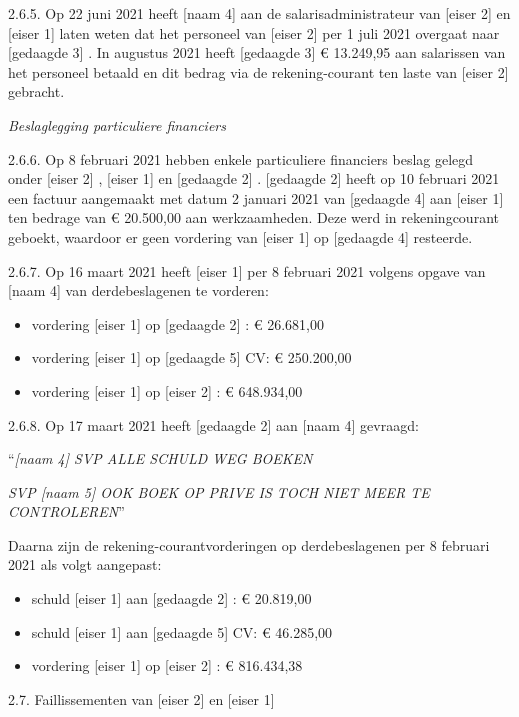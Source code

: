 \documentclass[
  dutch,
  a4paper,
]{article}
\begin{document}
2.6.5. Op 22 juni 2021 heeft {[}naam 4{]} aan de salarisadministrateur van {[}eiser 2{]} en {[}eiser 1{]} laten weten dat het personeel van {[}eiser 2{]} per 1 juli 2021 overgaat naar {[}gedaagde 3{]} . In augustus 2021 heeft {[}gedaagde 3{]} € 13.249,95 aan salarissen van het personeel betaald en dit bedrag via de rekening-courant ten laste van {[}eiser 2{]} gebracht.

\emph{Beslaglegging particuliere financiers}

2.6.6. Op 8 februari 2021 hebben enkele particuliere financiers beslag gelegd onder {[}eiser 2{]} , {[}eiser 1{]} en {[}gedaagde 2{]} . {[}gedaagde 2{]} heeft op 10 februari 2021 een factuur aangemaakt met datum 2 januari 2021 van {[}gedaagde 4{]} aan {[}eiser 1{]} ten bedrage van € 20.500,00 aan werkzaamheden. Deze werd in rekeningcourant geboekt, waardoor er geen vordering van {[}eiser 1{]} op {[}gedaagde 4{]} resteerde.

2.6.7. Op 16 maart 2021 heeft {[}eiser 1{]} per 8 februari 2021 volgens opgave van {[}naam 4{]} van derdebeslagenen te vorderen:

\begin{itemize}
\item
  vordering {[}eiser 1{]} op {[}gedaagde 2{]} : € 26.681,00
\item
  vordering {[}eiser 1{]} op {[}gedaagde 5{]} CV: € 250.200,00
\item
  vordering {[}eiser 1{]} op {[}eiser 2{]} : € 648.934,00
\end{itemize}

2.6.8. Op 17 maart 2021 heeft {[}gedaagde 2{]} aan {[}naam 4{]} gevraagd:

``\emph{{[}naam 4{]} SVP ALLE SCHULD WEG BOEKEN}

\emph{SVP {[}naam 5{]} OOK BOEK OP PRIVE IS TOCH NIET MEER TE CONTROLEREN}''

Daarna zijn de rekening-courantvorderingen op derdebeslagenen per 8 februari 2021 als volgt aangepast:

\begin{itemize}
\item
  schuld {[}eiser 1{]} aan {[}gedaagde 2{]} : € 20.819,00
\item
  schuld {[}eiser 1{]} aan {[}gedaagde 5{]} CV: € 46.285,00
\item
  vordering {[}eiser 1{]} op {[}eiser 2{]} : € 816.434,38
\end{itemize}

2.7. Faillissementen van {[}eiser 2{]} en {[}eiser 1{]}
\end{document}
